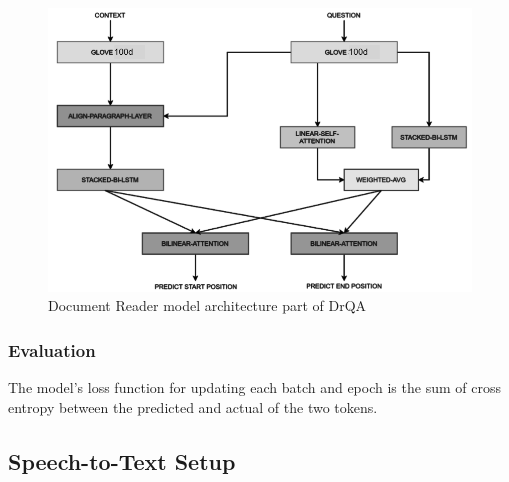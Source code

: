 \begin{figure}[!t]
    \centering
    \includegraphics[width=\linewidth]{img/DrQA.png}
    \caption{Document Reader model architecture part of DrQA}
    \label{fig:DrQA}
\end{figure}





\subsubsection{Evaluation}

The model's loss function for updating each batch and epoch is the sum of cross entropy between the predicted and actual of the two tokens. 


\subsection{Speech-to-Text Setup}



